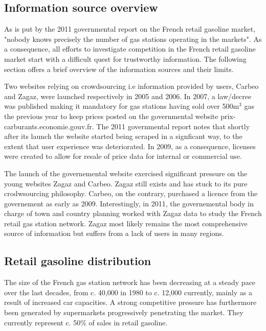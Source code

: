 \documentclass[11pt]{article}
\begin{document}
\subsection{Information source overview}

As is put by the 2011 governmental report on the French retail gasoline market, "nobody knows precisely the number of gas stations operating in the markets". As a consequence, all efforts to investigate competition in the French retail gasoline market start with a difficult quest for trustworthy information. The following section offers a brief overview of the information sources and their limits.

Two websites relying on crowdsourcing i.e information provided by users, Carbeo and Zagaz, were launched respectively in 2005 and 2006. In 2007, a law/decree was published making it mandatory for gas stations having sold over 500m$^{3}$ gas the previous year to keep prices posted on the governmental website prix-carburants.economie.gouv.fr. The 2011 governmental report notes that shortly after its launch the website started being scraped in a signficant way, to the extent that user experience was deteriorated. In 2009, as a consequence, licenses were created to allow for resale of price data for internal or commercial use.

The launch of the governemental website exercised significant pressure on the young websites Zagaz and Carbeo. Zagaz still exists and has stuck to its pure crodwsourcing philosophy. Carbeo, on the contrary, purchased a licence from the governement as early as 2009. Interestingly, in 2011, the governemental body in charge of town and country planning worked with Zagaz data to study the French retail gas station network. Zagaz most likely remains the most comprehensive source of information but suffers from a lack of users in many regions.

\subsection{Retail gasoline distribution}

The size of the French gas station network has been decreasing at a steady pace over the last decades, from c. 40,000 in 1980 to c. 12,000 currently, mainly as a result of increased car capacities.  A strong competitive pressure has furthermore been generated by supermarkets progressively penetrating the market. They currently represent c. 50\% of sales in retail gasoline.
\end{document}
